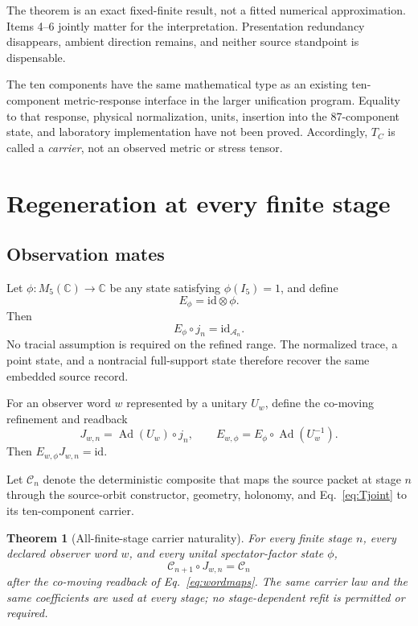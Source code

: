 \documentclass[11pt]{article}
\newtheorem{theorem}{Theorem}[section]
\theoremstyle{definition}
\theoremstyle{remark}
\newcommand{\cA}{\mathcal{A}}
\newcommand{\cC}{\mathcal{C}}
\newcommand{\Ad}{\operatorname{Ad}}
\begin{document}
The theorem is an exact fixed-finite result, not a fitted numerical approximation. Items 4--6 jointly matter for the interpretation. Presentation redundancy disappears, ambient direction remains, and neither source standpoint is dispensable.

The ten components have the same mathematical type as an existing ten-component metric-response interface in the larger unification program. Equality to that response, physical normalization, units, insertion into the 87-component state, and laboratory implementation have not been proved. Accordingly, $T_C$ is called a \emph{carrier}, not an observed metric or stress tensor.

\section{Regeneration at every finite stage}

\subsection{Observation mates}

Let $\phi:M_5(\mathbb C)\to\mathbb C$ be any state satisfying $\phi(I_5)=1$, and define
\begin{equation}\label{eq:obsmate}
 E_\phi=\mathrm{id}\otimes\phi.
\end{equation}
Then
\begin{equation}\label{eq:mateidentity}
 E_\phi\circ j_n=\mathrm{id}_{\cA_n}.
\end{equation}
No tracial assumption is required on the refined range. The normalized trace, a point state, and a nontracial full-support state therefore recover the same embedded source record.

For an observer word $w$ represented by a unitary $U_w$, define the co-moving refinement and readback
\begin{equation}\label{eq:wordmaps}
 J_{w,n}=\Ad(U_w)\circ j_n,
 \qquad
 E_{w,\phi}=E_\phi\circ\Ad(U_w^{-1}).
\end{equation}
Then $E_{w,\phi}J_{w,n}=\mathrm{id}$.

Let $\cC_n$ denote the deterministic composite that maps the source packet at stage $n$ through the source-orbit constructor, geometry, holonomy, and Eq.~\eqref{eq:Tjoint} to its ten-component carrier.

\begin{theorem}[All-finite-stage carrier naturality]\label{thm:x61}
For every finite stage $n$, every declared observer word $w$, and every unital spectator-factor state $\phi$,
\begin{equation}\label{eq:naturality}
 \cC_{n+1}\circ J_{w,n}=\cC_n
\end{equation}
after the co-moving readback of Eq.~\eqref{eq:wordmaps}. The same carrier law and the same coefficients are used at every stage; no stage-dependent refit is permitted or required.
\end{theorem}
\end{document}
